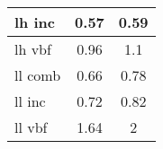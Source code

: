 \documentclass{beamer}
\begin{document}
\begin{frame}
\begin{normalsize}
\begin{minipage}{\textwidth}
\begin{minipage}[c]{0.19\textwidth}
\begin{table}
{{\begin{tabular}{| l | c | c |}
lh inc     &     0.57          &     0.59          \\\hline
lh vbf     &     0.96         &        1.1	       \\\hline
ll comb     &     0.66         &  0.78	             \\\hline
ll inc     &      0.72        &     0.82          \\\hline
ll vbf     &       1.64        &     2          \\\hline
\end{tabular}
}}
\end{table}
\end{minipage}
\end{minipage}
\end{normalsize}
\end{frame}
\end{document}
